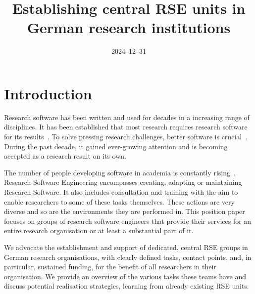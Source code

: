 \documentclass[a4paper]{article}
\title{Establishing central RSE units in German research institutions}
\date{2024--12--31}
\begin{document}
\maketitle

\section{Introduction}
Research software has been written and used for decades in a increasing range of disciplines.
It has been established that most research requires research software for its results~\autocite{Hannay2009, Hettrick2015}.
To solve pressing research challenges, better software is crucial~\autocite{Goble2014}.
During the past decade, it gained ever-growing attention and is becoming accepted as a research result on its own.

The number of people developing software in academia is constantly rising~\autocite{Hannay2009, Hettrick2015}.
Research Software Engineering encompasses creating, adapting or maintaining Research Software.
It also includes consultation and training with the aim to enable researchers to some of these tasks themselves.
These actions are very diverse and so are the environments they are performed in.
This position paper focuses on groups of research software engineers that provide their services for an entire research organisation or at least a substantial part of it.

We advocate the establishment and support of dedicated, central RSE groups in German research organisations, with clearly defined tasks, contact points, and, in particular, sustained funding, for the benefit of all researchers in their organisation.
We provide an overview of the various tasks these teams have and discuss potential realisation strategies, learning from already existing RSE units.
\end{document}

